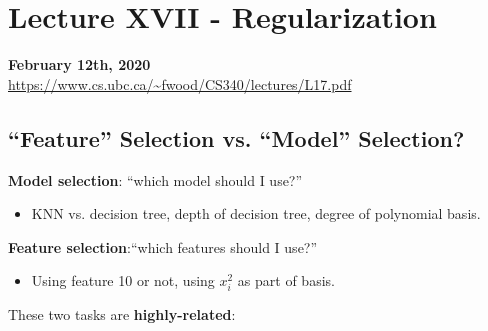 \documentclass{article}
\def\blu#1{{\color{blu}#1}}
\def\gre#1{{\color{gre}#1}}
\theoremstyle{definition}
\begin{document}
\section*{Lecture XVII - Regularization}
\textbf{February 12th, 2020} \\
\url{https://www.cs.ubc.ca/~fwood/CS340/lectures/L17.pdf}

\subsection*{“Feature” Selection vs. “Model” Selection?}
\blu{\textbf{Model selection}}: “which model should I use?”
\begin{itemize}
	\item KNN vs. decision tree, depth of decision tree, \gre{degree of polynomial basis}. 
\end{itemize}
\blu{\textbf{Feature selection}}:“which features should I use?”
\begin{itemize}
	\item Using feature 10 or not, \gre{using $ x_i^2 $ as part of basis}.
\end{itemize}
These two tasks are \gre{\textbf{highly-related}}:
\end{document}
